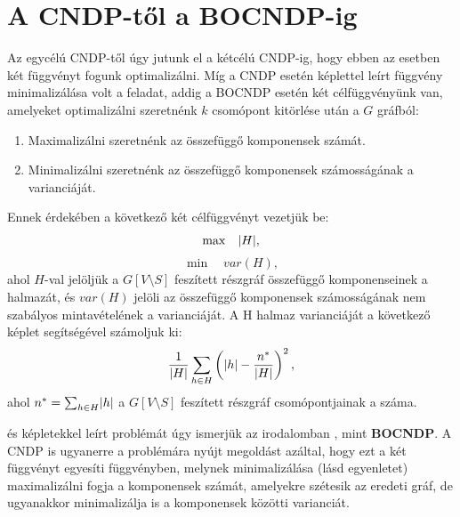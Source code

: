\section{A CNDP-től a BOCNDP-ig}

Az egycélú CNDP-től úgy jutunk el a kétcélú CNDP-ig, hogy ebben az esetben két függvényt fogunk optimalizálni.
Míg a CNDP esetén  képlettel leírt függvény minimalizálása volt a feladat,
addig a BOCNDP esetén két célfüggvényünk van, amelyeket optimalizálni szeretnénk $k$ csomópont kitörlése után a $G$ gráfból:
\begin{enumerate}
  \item Maximalizálni szeretnénk az összefüggő komponensek számát.
  \item Minimalizálni szeretnénk az összefüggő komponensek számosságának a varianciáját.
\end{enumerate}

Ennek érdekében a következő két célfüggvényt vezetjük be:
\begin{equation}\label{eqn:MAX_CONNECTED_COMPONENTS}
  \max \quad \lvert H\rvert,
\end{equation}
\begin{equation}\label{eqn:MIN_CARDINALITY_VARIANCE_COMPONENTS}
  \min \quad var(H),
\end{equation}
ahol $H$-val jelöljük a $G\left[ V \setminus S \right]$ feszített részgráf összefüggő komponenseinek a halmazát,
és $var(H)$ jelöli az összefüggő komponensek számosságának nem szabályos mintavételének a varianciáját.
A H halmaz varianciáját a következő képlet segítségével számoljuk ki:
\begin{equation}\label{eqn:CARDINALITY_VARIANCE_COMPONENTS}
  \dfrac{1}{ \lvert H\rvert } \sum_{h \in H} \left( \lvert h\rvert - \dfrac{ n^{*} }{ \lvert H\rvert } \right)^{2},
\end{equation}
ahol $n^{*} = \sum_{h \in H} \lvert h\rvert$ a $G\left[ V \setminus S \right]$ feszített részgráf csomópontjainak a száma.

 és 
képletekkel leírt problémát úgy ismerjük az irodalomban \cite{ventresca2018bi}, mint \textbf{BOCNDP}.
A CNDP is ugyanerre a problémára nyújt megoldást azáltal,
hogy ezt a két függvényt egyesíti  függvényben,
melynek minimalizálása (lásd  egyenletet) maximalizálni fogja a komponensek számát, amelyekre szétesik az eredeti gráf,
de ugyanakkor minimalizálja is a komponensek közötti varianciát.

